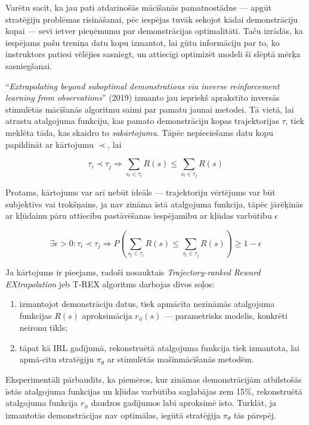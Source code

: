\documentclass[12pt, a4paper]{article}
\numberwithin{equation}{section} %
\begin{document}
Varētu sacīt, ka jau pati atdarinošās mācīšanās pamatnostādne --- apgūt stratēģiju problēmas risināšanai, pēc iespējas tuvāk sekojot kādai demonstrāciju kopai --- sevī ietver pieņēmumu par demonstrācijas optimalitāti. Taču izrādās, ka iespējams pašu treniņa datu kopu izmantot, lai gūtu informāciju par to, ko instruktors patiesi vēlējies sasniegt, un attiecīgi optimizēt modeli šī slēptā mērķa sasniegšanai.

``\textit{Extrapolating beyond suboptimal demonstrations via inverse reinforcement learning from observations}'' \cite{brown2019extrapolating} (2019) izmanto jau iepriekš aprakstīto inversās stimulētās mācīšanās algoritmu saimi par pamatu jaunai metodei. Tā vietā, lai atrastu atalgojuma funkciju, kas pamato demonstrāciju kopas trajektorijas $\tau$, tiek meklēta tāda, kas skaidro to \textit{sakārtojumu}. Tāpēc nepieciešams datu kopu papildināt ar kārtojumu $\prec$, lai

\begin{equation}
    \tau_i \prec \tau_j \Rightarrow \sum_{s_t \in \tau_i}R(s) \leq \sum_{s_t \in \tau_j}R(s)
\end{equation}

Protams, kārtojums var arī nebūt ideāls --- trajektoriju vērtējums var būt subjektīvs vai trokšņains, ja nav zināma īstā atalgojuma funkcija, tāpēc jārēķinās ar kļūdainu pāru attiecību pastāvēšanas iespējamību ar kļūdas varbūtību $\epsilon$

\begin{equation}
    \exists \epsilon > 0 : \tau_i \prec \tau_j \Rightarrow P\left(\sum_{s_t \in \tau_i}R(s) \leq \sum_{s_t \in \tau_j}R(s)\right) \geq 1 - \epsilon
\end{equation}

Ja kārtojums ir pieejams, radoši nosauktais \textit{Trajectory-ranked Reward EXtrapolation} jeb T-REX algoritms darbojas divos soļos:

\begin{enumerate}
    \item izmantojot demonstrāciju datus, tiek apmācīta nezināmās atalgojuma funkcijas $R(s)$ aproksimācija $r_{\phi}(s)$ --- parametrisks modelis, konkrēti neironu tīkls;
    \item tāpat kā IRL gadījumā, rekonstruētā atalgojuma funkcija tiek izmantota, lai apmā-cītu stratēģiju $\pi_{\theta}$ ar stimulētās mašīnmācīšanās metodēm.
\end{enumerate}

Eksperimentāli pārbaudīts, ka piemēros, kur zināmas demonstrācijām atbilstošās īstās atalgojuma funkcijas un kļūdas varbūtība saglabājas zem 15\%, rekonstruētā atalgojuma funkcija $r_{\phi}$ daudzos gadījumos labi aproksimē īsto. Turklāt, ja izmantotās demonstrācijas nav optimālas, iegūtā stratēģija $\pi_{\theta}$ tās pārspēj.
\end{document}
